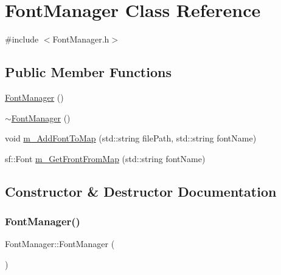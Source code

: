 \hypertarget{class_font_manager}{}\section{Font\+Manager Class Reference}
\label{class_font_manager}


{\ttfamily \#include $<$Font\+Manager.\+h$>$}

\subsection*{Public Member Functions}
\begin{DoxyCompactItemize}
\item 
\mbox{\hyperlink{class_font_manager_a2f89acd28b5bd24e747aacd3208131ef}{Font\+Manager}} ()
\item 
\mbox{\hyperlink{class_font_manager_aa190bb023b4cf2ad28e24c69ef57f380}{$\sim$\+Font\+Manager}} ()
\item 
void \mbox{\hyperlink{class_font_manager_a54d5fbb26b5b7ae75862d8250832f0ad}{m\+\_\+\+Add\+Font\+To\+Map}} (std\+::string file\+Path, std\+::string font\+Name)
\item 
sf\+::\+Font \mbox{\hyperlink{class_font_manager_a467be1ef00c39800ac03107a768ff23c}{m\+\_\+\+Get\+Front\+From\+Map}} (std\+::string font\+Name)
\end{DoxyCompactItemize}


\subsection{Constructor \& Destructor Documentation}
\mbox{\label{class_font_manager_a2f89acd28b5bd24e747aacd3208131ef}} 
\subsubsection{\texorpdfstring{Font\+Manager()}{FontManager()}}
{\footnotesize\ttfamily Font\+Manager\+::\+Font\+Manager (\begin{DoxyParamCaption}{ }\end{DoxyParamCaption})}

\mbox{\label{class_font_manager_aa190bb023b4cf2ad28e24c69ef57f380}} 
